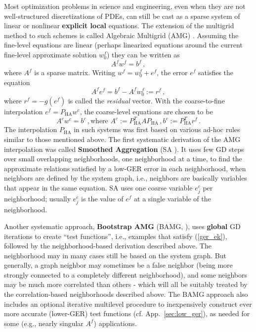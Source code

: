 \documentclass{article} %
\begin{document}
Most optimization problems in science and engineering, even when they are not well-structured discretizations of PDEs, can still be cast as a sparse system of linear or nonlinear \textbf{explicit local} equations. The extension of the multigrid method to such schemes is called Algebraic Multigrid (AMG) \cite{amg_book}. Assuming the fine-level equations are linear (perhaps linearized equations around the current fine-level approximate solution $w_0^f$) they can be written as
$$A^f w^f = b^f\,,$$
where $A^f$ is a sparse matrix. Writing $w^f = w_0^f + e^f$, the error $e^f$ satisfies the equation
$$A^f e^f = b^f - A^f w_0^f := r^f\,,$$
where $r^f = -g(e^f)$ is called the {\it residual} vector. With the coarse-to-fine interpolation $e^f = P_{\text{HA}} w^c$, the coarse-level equations are chosen to be
$$A^c w^c = b^c\,,\text{where } A^c := P_{\text{HA}}^T A P_{\text{HA}}\,, b^c := P_{\text{HA}}^T r^f\,.$$
The interpolation $P_{\text{HA}}$ in such systems was first based on various ad-hoc rules similar to those mentioned above. The first systematic derivation of the AMG interpolation was called \textbf{Smoothed Aggregation} (SA \cite{sa}). It uses few GD steps over small overlapping neighborhoods, one neighborhood at a time, to find the approximate relations satisfied by a low-GER error in each neighborhood, when neighbors are defined by the system graph, i.e., neighbors are basically variables that appear in the same equation. SA uses one coarse variable $e_j^c$ per neighborhood; usually $e_j^c$ is the value of $e^f$ at a single variable of the neighborhood.

Another systematic approach, \textbf{Bootstrap AMG} (BAMG, \cite[Sec.~17.2]{review2000}), uses \textbf{global} GD iterations to create ``test functions'', i.e., examples that satisfy (\ref{ger_ek}), followed by the neighborhood-based derivation described above. The neighborhood may in many cases still be based on the system graph. But generally, a graph neighbor may sometimes be a false neighbor (being more strongly connected to a completely different neighborhood), and some neighbors may be much more correlated than others - which will all be suitably treated by the correlation-based neighborhoods described above. The BAMG approach also includes an optional iterative multilevel procedure to inexpensively construct ever more accurate (lower-GER) test functions (cf. App.~\ref{sec:low_ger}), as needed for some (e.g., nearly singular $A^f$) applications.
\end{document}
